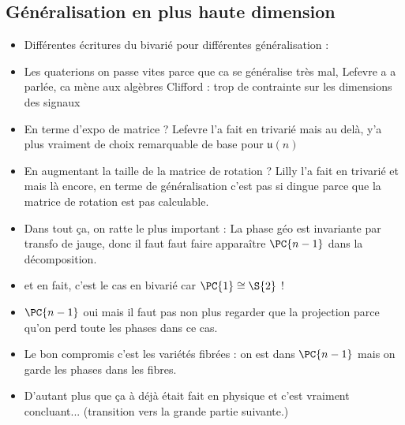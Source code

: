 \subsection{Généralisation en plus haute dimension} \label{subsec:aller_plus_loin}

\begin{itemize}
	
	\item Différentes écritures du bivarié pour différentes généralisation :
	
	\item Les quaterions on passe vites parce que ca se généralise très mal, Lefevre a a parlée, ca mène aux algèbres Clifford : trop de contrainte sur les dimensions des signaux
	
	\item En terme d'expo de matrice ? Lefevre \cite[sec. I.3]{lefevre_polarization_2021} l'a fait en trivarié mais au delà, y'a plus vraiment de choix remarquable de base pour $\mathfrak{u}(n)$
	
	\item En augmentant la taille de la matrice de rotation ? Lilly \cite{lilly_modulated_2011} l'a fait en trivarié et mais là encore, en terme de généralisation c'est pas si dingue parce que la matrice de rotation est pas calculable.
	
	\item Dans tout ça, on ratte le plus important : La phase géo est invariante par transfo de jauge, donc il faut faut faire apparaître $\PC{n-1}$ dans la décomposition.
	
	\item et en fait, c'est le cas en bivarié car $\PC{1}\cong \S{2}$ !
	
	\item $\PC{n-1}$ oui mais il faut pas non plus regarder que la projection parce qu'on perd toute les phases dans ce cas.
	
	\item Le bon compromis c'est les variétés fibrées : on est dans $\PC{n-1}$ mais on garde les phases dans les fibres.
	
	\item D'autant plus que ça à déjà était fait en physique et c'est vraiment concluant... (transition vers la grande partie suivante.)
	
\end{itemize}








